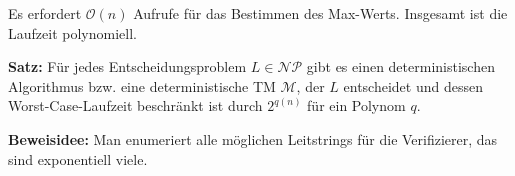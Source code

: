 \documentclass{scrartcl}%
\begin{document}
    Es erfordert $\mathcal{O}(n)$ Aufrufe für das Bestimmen des Max-Werts. Insgesamt ist die Laufzeit polynomiell.\proofend

    \vspace*{0.3cm}
    \textbf{\textsf{Satz:}} Für jedes Entscheidungsproblem $L \in \mathcal{N}\mathcal{P}$ gibt es einen
    deterministischen Algorithmus bzw. eine deterministische TM $\mathcal{M}$, der $L$ entscheidet und dessen Worst-Case-Laufzeit beschränkt ist durch $2^{q(n)}$ für ein Polynom $q$.

    \vspace*{0.3cm}
    \textbf{\textsf{Beweisidee:}} Man enumeriert alle möglichen Leitstrings für die Verifizierer, das sind exponentiell viele.
\end{document}
